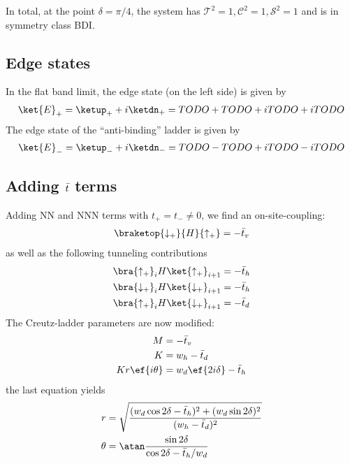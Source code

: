 In total, at the point $\delta=\pi/4$, the system has $\mathcal{T}^2=1, \mathcal{C}^2=1, \mathcal{S}^2=1$ and is in symmetry class BDI.

\subsection{Edge states}
In the flat band limit, the edge state (on the left side) is given by
\begin{align}
    \ket{E}_+ = \ketup_+ + i \ketdn_+ = \upp + \dnm + i\dnp + i\upm
\end{align}
The edge state of the ``anti-binding'' ladder is given by
\begin{align}
    \ket{E}_- = \ketup_- + i \ketdn_- = \upp - \dnm + i\dnp - i\upm
\end{align}


\subsection{Adding \texorpdfstring{$\bar{t}$}{t-bar} terms}
Adding NN and NNN terms with $t_+=t_-\ne 0$, we find an on-site-coupling:
\begin{align}
    \braketop{\downarrow_+}{H}{\uparrow_+} = -\tbar_v
\end{align}
as well as the following tunneling contributions
\begin{align}
    \bra{\uparrow_+}_{i}H\ket{\uparrow_+}_{i+1} &= -\tbar_h \\
    \bra{\downarrow_+}_{i}H\ket{\downarrow_+}_{i+1} &= -\tbar_h \\
    \bra{\uparrow_+}_{i}H\ket{\downarrow_+}_{i+1} &= -\tbar_d
\end{align}
The Creutz-ladder parameters are now modified:
\begin{align}
    M &= -\tbar_v \\
    K &= w_h - \tbar_d\\
    K r \ef{i \theta} &= w_d \ef{2i\delta} - \tbar_h
\end{align}
the last equation yields
\begin{align}
    r &= \sqrt{\frac{(w_d\cos 2\delta - \tbar_h)^2 + (w_d \sin 2\delta)^2}{(w_h-\tbar_d)^2}} \\
    \theta &= \atan \frac{\sin 2\delta}{\cos 2\delta-\tbar_h/w_d}
\end{align}

